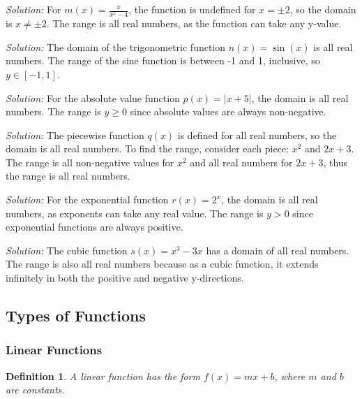 \documentclass[a4paper,12pt]{book}
\newenvironment{solution}[1][]
{\par\noindent\textit{Solution:} \rmfamily}{\medskip}
\newtheorem{definition}{Definition}
\begin{document}
\begin{solution}[5]
For \( m(x) = \frac{x}{x^2 - 4} \), the function is undefined for \( x = \pm 2 \), so the domain is \( x \neq \pm 2 \). The range is all real numbers, as the function can take any y-value.
\end{solution}

\begin{solution}[6]
The domain of the trigonometric function \( n(x) = \sin(x) \) is all real numbers. The range of the sine function is between -1 and 1, inclusive, so \( y \in [-1, 1] \).
\end{solution}

\begin{solution}[7]
For the absolute value function \( p(x) = |x + 5| \), the domain is all real numbers. The range is \( y \geq 0 \) since absolute values are always non-negative.
\end{solution}

\begin{solution}[8]
The piecewise function \( q(x) \) is defined for all real numbers, so the domain is all real numbers. To find the range, consider each piece: \( x^2 \) and \( 2x + 3 \). The range is all non-negative values for \( x^2 \) and all real numbers for \( 2x + 3 \), thus the range is all real numbers.
\end{solution}

\begin{solution}[9]
For the exponential function \( r(x) = 2^x \), the domain is all real numbers, as exponents can take any real value. The range is \( y > 0 \) since exponential functions are always positive.
\end{solution}

\begin{solution}[10]
The cubic function \( s(x) = x^3 - 3x \) has a domain of all real numbers. The range is also all real numbers because as a cubic function, it extends infinitely in both the positive and negative y-directions.
\end{solution}


\subsection{Types of Functions}
\subsubsection{Linear Functions}
\begin{definition}
A linear function has the form \( f(x) = mx + b \), where \( m \) and \( b \) are constants.
\end{definition}
\end{document}
